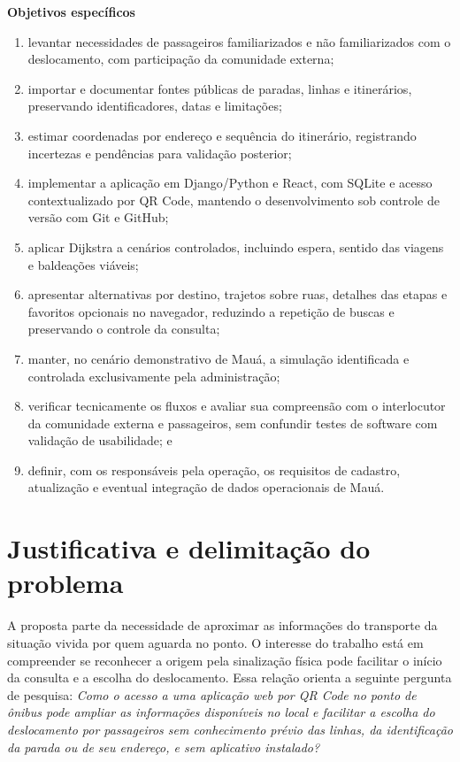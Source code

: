 \documentclass[12pt,oneside,a4paper,brazil,chapter=TITLE]{abntex2}
\let\papsection\section
\renewcommand{\section}{\clearpage\papsection}
\begin{document}
\noindent\textbf{Objetivos específicos}\par
\begin{enumerate}[label=\alph*),itemsep=2pt,parsep=0pt]
\item levantar necessidades de passageiros familiarizados e não familiarizados com o deslocamento, com participação da comunidade externa;
\item importar e documentar fontes públicas de paradas, linhas e itinerários, preservando identificadores, datas e limitações;
\item estimar coordenadas por endereço e sequência do itinerário, registrando incertezas e pendências para validação posterior;
\item implementar a aplicação em Django/Python e React, com SQLite e acesso contextualizado por QR Code, mantendo o desenvolvimento sob controle de versão com Git e GitHub;
\item aplicar Dijkstra a cenários controlados, incluindo espera, sentido das viagens e baldeações viáveis;
\item apresentar alternativas por destino, trajetos sobre ruas, detalhes das etapas e favoritos opcionais no navegador, reduzindo a repetição de buscas e preservando o controle da consulta;
\item manter, no cenário demonstrativo de Mauá, a simulação identificada e controlada exclusivamente pela administração;
\item verificar tecnicamente os fluxos e avaliar sua compreensão com o interlocutor da comunidade externa e passageiros, sem confundir testes de software com validação de usabilidade; e
\item definir, com os responsáveis pela operação, os requisitos de cadastro, atualização e eventual integração de dados operacionais de Mauá.
\end{enumerate}

\section{Justificativa e delimitação do problema}
A proposta parte da necessidade de aproximar as informações do transporte da situação vivida por quem aguarda no ponto. O interesse do trabalho está em compreender se reconhecer a origem pela sinalização física pode facilitar o início da consulta e a escolha do deslocamento. Essa relação orienta a seguinte pergunta de pesquisa: \textit{Como o acesso a uma aplicação web por QR Code no ponto de ônibus pode ampliar as informações disponíveis no local e facilitar a escolha do deslocamento por passageiros sem conhecimento prévio das linhas, da identificação da parada ou de seu endereço, e sem aplicativo instalado?}
\end{document}
